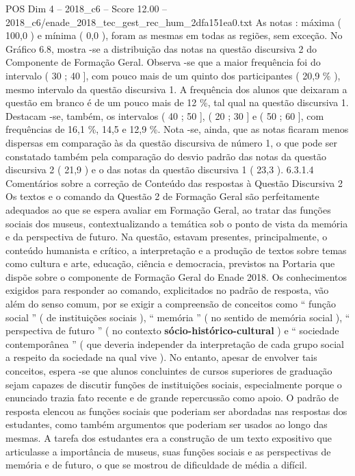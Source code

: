 \begin{textsample}{POS Dim 4 – 2018\_c6 – Score 12.00 – 2018\_c6/enade\_2018\_tec\_gest\_rec\_hum\_2dfa151ea0.txt}
As notas : máxima ( 100,0 ) e mínima ( 0,0 ), foram as mesmas em todas as regiões, sem exceção.
No Gráfico 6.8, mostra -se a distribuição das notas na questão discursiva 2 do Componente de Formação Geral.
Observa -se que a maior frequência foi do intervalo ( 30 ; 40 ], com pouco mais de um quinto dos participantes ( 20,9 \% ), mesmo intervalo da questão discursiva 1.
A frequência dos alunos que deixaram a questão em branco é de um pouco mais de 12 \%, tal qual na questão discursiva 1.
Destacam -se, também, os intervalos ( 40 ; 50 ], ( 20 ; 30 ] e ( 50 ; 60 ], com frequências de 16,1 \%, 14,5 e 12,9 \%.
Nota -se, ainda, que as notas ficaram menos dispersas em comparação às da questão discursiva de número 1, o que pode ser constatado também pela comparação do desvio padrão das notas da questão discursiva 2 ( 21,9 ) e o das notas da questão discursiva 1 ( 23,3 ). 6.3.1.4 Comentários sobre a correção de Conteúdo das respostas à Questão Discursiva 2 Os textos e o comando da Questão 2 de Formação Geral são perfeitamente adequados ao que se espera avaliar em Formação Geral, ao tratar das funções sociais dos museus, contextualizando a temática sob o ponto de vista da memória e da perspectiva de futuro.
Na questão, estavam presentes, principalmente, o conteúdo humanista e crítico, a interpretação e a produção de textos sobre temas como cultura e arte, educação, ciência e democracia, previstos na Portaria que dispõe sobre o componente de Formação Geral do Enade 2018.
Os conhecimentos exigidos para responder ao comando, explicitados no padrão de resposta, vão além do senso comum, por se exigir a compreensão de conceitos como “ função social ” ( de instituições sociais ), “ memória ” ( no sentido de memória social ), “ perspectiva de futuro ” ( no contexto \textbf{sócio-histórico-cultural} ) e “ sociedade contemporânea ” ( que deveria independer da interpretação de cada grupo social a respeito da sociedade na qual vive ).
No entanto, apesar de envolver tais conceitos, espera -se que alunos concluintes de cursos superiores de graduação sejam capazes de discutir funções de instituições sociais, especialmente porque o enunciado trazia fato recente e de grande repercussão como apoio.
O padrão de resposta elencou as funções sociais que poderiam ser abordadas nas respostas dos estudantes, como também argumentos que poderiam ser usados ao longo das mesmas.
A tarefa dos estudantes era a construção de um texto expositivo que articulasse a importância de museus, suas funções sociais e as perspectivas de memória e de futuro, o que se mostrou de dificuldade de média a difícil.

\end{textsample}
